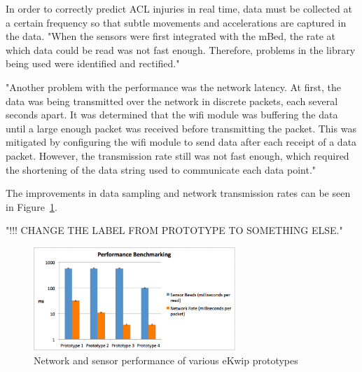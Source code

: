 In order to correctly predict ACL injuries in real time, data must be collected at a certain frequency so that subtle movements and accelerations are captured in the data. "When the sensors were first integrated with the mBed, the rate at which data could be read was not fast enough. Therefore, problems in the library being used were identified and rectified."

"Another problem with the performance was the network latency. At first, the data was being transmitted over the network in discrete packets, each several seconds apart. It was determined that the wifi module was buffering the data until a large enough packet was received before transmitting the packet. This was mitigated by configuring the wifi module to send data after each receipt of a data packet. However, the transmission rate still was not fast enough, which required the shortening of the data string used to communicate each data point."

The improvements in data sampling and network transmission rates can be seen in Figure~\ref{fig:graph}.

"!!! CHANGE THE LABEL FROM PROTOTYPE TO SOMETHING ELSE."

\begin{figure}[h]
  \begin{center}
    \includegraphics[width=3in]{images/graph.png}
  \end{center}
  \caption{Network and sensor performance of various eKwip prototypes}
  \label{fig:graph}
\end{figure}
